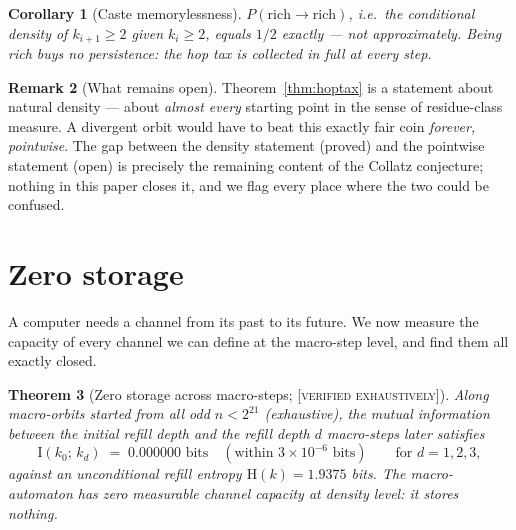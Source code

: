 \documentclass[11pt]{article}
\newtheorem{theorem}{Theorem}[section]
\newtheorem{corollary}[theorem]{Corollary}
\theoremstyle{definition}
\newtheorem{remark}[theorem]{Remark}
\newcommand{\VERIFIED}{\textup{[\textsc{verified exhaustively}]}}
\newcommand{\Info}{\mathrm{I}}
\newcommand{\Ent}{\mathrm{H}}
\begin{document}
\begin{corollary}[Caste memorylessness]
$P(\mathrm{rich} \to \mathrm{rich})$, i.e.\ the conditional density of $k_{i+1} \geq 2$
given $k_i \geq 2$, equals $1/2$ exactly --- not approximately. Being rich buys no
persistence: the hop tax is collected in full at every step.
\end{corollary}

\begin{remark}[What remains open]
Theorem~\ref{thm:hoptax} is a statement about natural density --- about \emph{almost
every} starting point in the sense of residue-class measure. A divergent orbit would
have to beat this exactly fair coin \emph{forever, pointwise}. The gap between the
density statement (proved) and the pointwise statement (open) is precisely the remaining
content of the Collatz conjecture; nothing in this paper closes it, and we flag every
place where the two could be confused.
\end{remark}

\section{Zero storage}

A computer needs a channel from its past to its future. We now measure the capacity of
every channel we can define at the macro-step level, and find them all exactly closed.

\begin{theorem}[Zero storage across macro-steps; \VERIFIED]\label{thm:zerostorage}
Along macro-orbits started from all odd $n < 2^{21}$ (exhaustive), the mutual
information between the initial refill depth and the refill depth $d$ macro-steps later
satisfies
\[
\Info(k_0;\, k_d) \;=\; 0.000000 \text{ bits} \quad (\text{within } 3 \times 10^{-6}
\text{ bits}) \qquad \text{for } d = 1, 2, 3,
\]
against an unconditional refill entropy $\Ent(k) = 1.9375$ bits. The macro-automaton
has zero measurable channel capacity at density level: it stores nothing.
\end{theorem}
\end{document}
